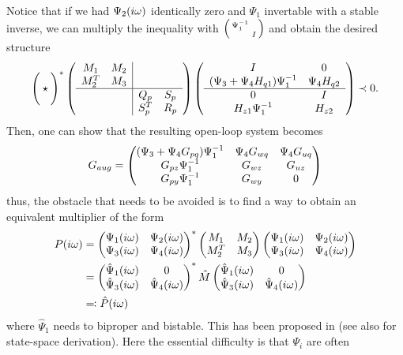 Notice that if we had $\Psi_2(i\omega)$ identically zero and $\Psi_1$ invertable with a stable inverse, we can multiply 
the inequality with $\begin{psmallmatrix}\Psi_1^{-1}&\\&I\end{psmallmatrix}$ and obtain the desired structure 
\[
\Bigg(\star\Bigg)^*
\left(
\begin{array}{cc|cc}
M_1&M_2&&\\M^T_2&M_3&&\\\hline &&Q_p&S_p\\&&S_p^T&R_p
\end{array}
\right)
\left(
\begin{array}{cc}
	I&0\\
	(\Psi_3 + \Psi_4H_{q1})\Psi_1^{-1} &\Psi_4H_{q2}\\\hline
	0& I\\
	H_{z1}\Psi_1^{-1} &H_{z2}
\end{array}
\right)
\prec 0.
\]
Then, one can show that the resulting open-loop system becomes 
\begin{equation}
G_{aug} = \begin{pmatrix}
(\Psi_3 + \Psi_4G_{pq})\Psi_1^{-1} &\Psi_4G_{wq} &\Psi_4G_{uq}\\
G_{pz}\Psi_1^{-1}                  &G_{wz}       &G_{uz}\\
G_{py}\Psi_1^{-1}                  &G_{wy}       &0\\
\end{pmatrix}
\label{eq:augplant}
\end{equation}
thus, the obstacle that needs to be avoided is to find a way to obtain an equivalent multiplier of the form
\begin{align}
P(\iw) &= \pmatr{\Psi_1(\iw)&\Psi_2(\iw)\\ \Psi_3(\iw)&\Psi_4(\iw)}^*\pmatr{M_1&M_2\\M^T_2&M_3}\pmatr{\Psi_1(\iw)&\Psi_2(\iw)\\ \Psi_3(\iw)&\Psi_4(\iw)} \\
&= \pmatr{\hat{\Psi}_1(\iw)&0\\ \hat{\Psi}_3(\iw)&\hat{\Psi}_4(\iw)}^*\hat{M}\pmatr{\hat{\Psi}_1(\iw)&0\\ \hat{\Psi}_3(\iw)&\hat{\Psi}_4(\iw)}\\
&\mathrel{\reflectbox{$\coloneqq$}} \hat{P}(\iw)
\end{align}
where $\hat{\Psi}_1$ needs to biproper and bistable. This has been proposed in \cite{goh96,goh962} (see also
\cite{veenmanIFAC} for state-space derivation). Here the essential difficulty is that $\Psi_i$ are often 
